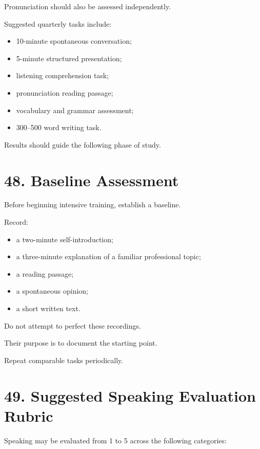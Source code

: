 Pronunciation should also be assessed independently.

Suggested quarterly tasks include:

\begin{itemize}
    \item 10-minute spontaneous conversation;
    \item 5-minute structured presentation;
    \item listening comprehension task;
    \item pronunciation reading passage;
    \item vocabulary and grammar assessment;
    \item 300--500 word writing task.
\end{itemize}

Results should guide the following phase of study.

\section*{48. Baseline Assessment}

Before beginning intensive training, establish a baseline.

Record:

\begin{itemize}
    \item a two-minute self-introduction;
    \item a three-minute explanation of a familiar professional topic;
    \item a reading passage;
    \item a spontaneous opinion;
    \item a short written text.
\end{itemize}

Do not attempt to perfect these recordings.

Their purpose is to document the starting point.

Repeat comparable tasks periodically.

\section*{49. Suggested Speaking Evaluation Rubric}

Speaking may be evaluated from 1 to 5 across the following categories:

